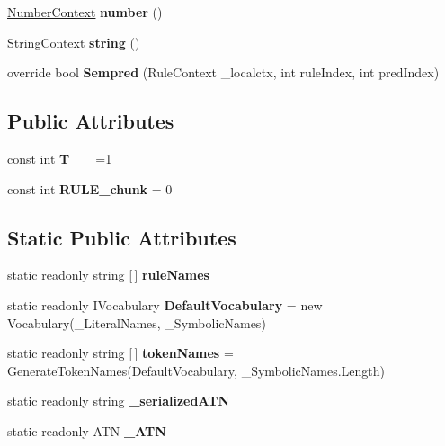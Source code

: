 \begin{DoxyCompactItemize}
\mbox{\hyperlink{classzlua_1_1_lua_parser_1_1_number_context}{Number\+Context}} {\bfseries number} ()
\item 
\mbox{\label{classzlua_1_1_lua_parser_a33911fe834f84db29fc9772488e334e4}} 
\mbox{\hyperlink{classzlua_1_1_lua_parser_1_1_string_context}{String\+Context}} {\bfseries string} ()
\item 
\mbox{\label{classzlua_1_1_lua_parser_aa9173bd5c087fa1c28247c9e45646def}} 
override bool {\bfseries Sempred} (Rule\+Context \+\_\+localctx, int rule\+Index, int pred\+Index)
\end{DoxyCompactItemize}
\subsection*{Public Attributes}
\begin{DoxyCompactItemize}
\item 
\mbox{\label{classzlua_1_1_lua_parser_acf5f8dbcad359c7b817e68c4d34ad34f}} 
const int {\bfseries T\+\_\+\+\_} =1
\item 
\mbox{\label{classzlua_1_1_lua_parser_a89f8e5b144b510897afb9f26a1c515d0}} 
const int {\bfseries R\+U\+L\+E\+\_\+chunk} = 0
\end{DoxyCompactItemize}
\subsection*{Static Public Attributes}
\begin{DoxyCompactItemize}
\item 
static readonly string \mbox{[}$\,$\mbox{]} {\bfseries rule\+Names}
\item 
\mbox{\label{classzlua_1_1_lua_parser_a8c5a46456e64945bb589f4d09d23ce90}} 
static readonly I\+Vocabulary {\bfseries Default\+Vocabulary} = new Vocabulary(\+\_\+\+Literal\+Names, \+\_\+\+Symbolic\+Names)
\item 
\mbox{\label{classzlua_1_1_lua_parser_aaafb1e89b3996524ecf9c41735e3842c}} 
static readonly string \mbox{[}$\,$\mbox{]} {\bfseries token\+Names} = Generate\+Token\+Names(Default\+Vocabulary, \+\_\+\+Symbolic\+Names.\+Length)
\item 
\mbox{\label{classzlua_1_1_lua_parser_aee1e1e79451c3948d77413d279fbc0b5}} 
static readonly string {\bfseries \+\_\+serialized\+A\+TN}
\item 
static readonly A\+TN {\bfseries \+\_\+\+A\+TN}
\end{DoxyCompactItemize}
